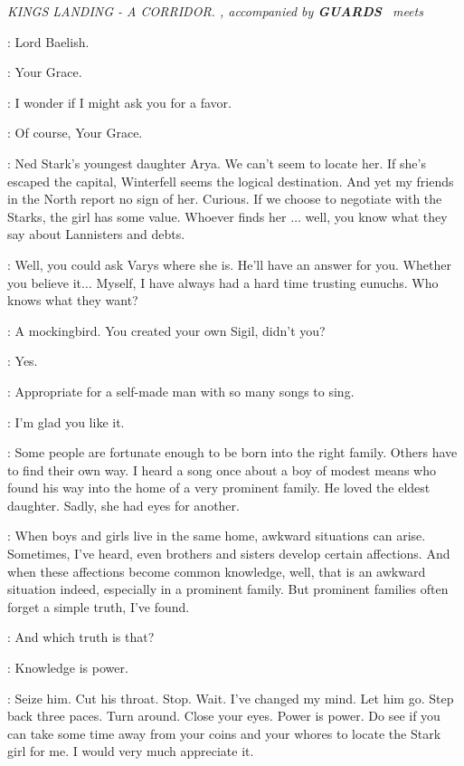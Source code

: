 \scene

\textit{KINGS LANDING - A CORRIDOR.  \CERSEI, accompanied by \textbf{GUARDS} ~meets \LITTLEFINGER}

\CERSEI: Lord Baelish.

\LITTLEFINGER: Your Grace.

\CERSEI: I wonder if I might ask you for a favor.

\LITTLEFINGER: Of course, Your Grace.

\CERSEI: Ned Stark's youngest daughter Arya. We can't seem to locate her. If she's escaped the capital, Winterfell seems the logical destination. And yet my friends in the North report no sign of her. Curious. If we choose to negotiate with the Starks, the girl has some value. Whoever finds her $\ldots$ well, you know what they say about Lannisters and debts.

\LITTLEFINGER: Well, you could ask Varys where she is. He'll have an answer for you. Whether you believe it$\ldots$ Myself, I have always had a hard time trusting eunuchs. Who knows what they want?

\CERSEI: A mockingbird. You created your own Sigil, didn't you?

\LITTLEFINGER: Yes.

\CERSEI: Appropriate for a self-made man with so many songs to sing.

\LITTLEFINGER: I'm glad you like it.

\CERSEI: Some people are fortunate enough to be born into the right family. Others have to find their own way. I heard a song once about a boy of modest means who found his way into the home of a very prominent family. He loved the eldest daughter. Sadly, she had eyes for another.

\LITTLEFINGER: When boys and girls live in the same home, awkward situations can arise. Sometimes, I've heard, even brothers and sisters develop certain affections. And when these affections become common knowledge, well, that is an awkward situation indeed, especially in a prominent family. But prominent families often forget a simple truth, I've found.

\CERSEI: And which truth is that?

\LITTLEFINGER: Knowledge is power.

\CERSEI: Seize him. Cut his throat. Stop. Wait. I've changed my mind. Let him go. Step back three paces. Turn around. Close your eyes. Power is power. Do see if you can take some time away from your coins and your whores to locate the Stark girl for me. I would very much appreciate it.


